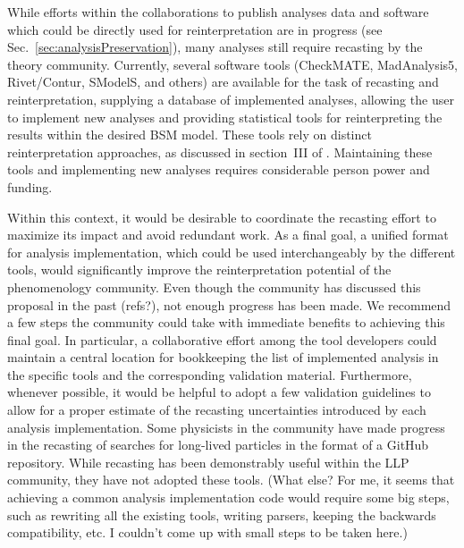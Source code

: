 \documentclass[11pt]{article}
\begin{document}
While efforts within the collaborations to publish analyses data and software which could be directly used for reinterpretation are in progress (see Sec.~\ref{sec:analysisPreservation}), many analyses still require recasting by the theory community.
Currently, several software tools (CheckMATE, MadAnalysis5, Rivet/Contur, SModelS, and others) are available for the task of recasting and reinterpretation,
supplying a database of implemented analyses, allowing the user to implement new analyses and providing statistical tools for reinterpreting the results within the desired BSM model.
These tools rely on distinct reinterpretation approaches, as discussed in section~III of \cite{LHCReinterpretationForum:2020xtr}.
Maintaining these tools and implementing new analyses requires considerable person power and funding.

Within this context, it would be desirable to coordinate the recasting effort to maximize its impact and avoid redundant work. As a final goal, a unified format for analysis implementation, which could be used interchangeably by the different tools, would significantly improve the reinterpretation potential of the phenomenology community.
Even though the community has discussed this proposal in the past (refs?), not enough progress has been made.
We recommend a few steps the community could take with immediate benefits to achieving this final goal.
In particular, a collaborative effort among the tool developers could maintain a central location for bookkeeping the list of implemented analysis in the specific tools and the corresponding validation material.
Furthermore, whenever possible, it would be helpful to adopt a few validation guidelines to allow for a proper estimate of the recasting uncertainties introduced by each analysis implementation.
Some physicists in the community have made progress in the recasting of searches for long-lived particles in the format of a GitHub repository\cite{llpRepo}.
While recasting has been demonstrably useful within the LLP community, they have not adopted these tools.
(What else? For me, it seems that achieving a common analysis implementation code would require some big steps, such as rewriting all the existing tools, writing parsers, keeping the backwards compatibility, etc. I couldn't come up with small steps to be taken here.)
\end{document}
